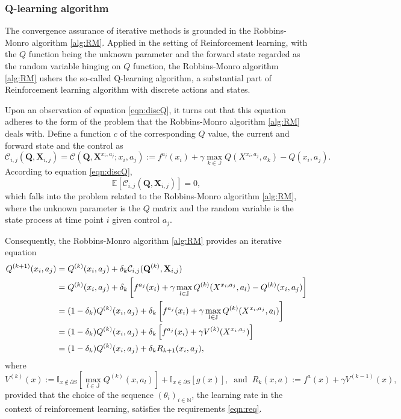 \documentclass[11pt,twoside]{article}
\numberwithin{Theorem}{section}
\numberwithin{Definition}{section}
\numberwithin{Lemma}{section}
\numberwithin{Algorithm}{section}
\numberwithin{equation}{section}
\begin{document}
\subsubsection{Q-learning algorithm}
The convergence assurance of iterative methods is grounded in the Robbins-Monro algorithm \ref{alg:RM}. Applied in the setting of Reinforcement learning, with the $Q$ function being the unknown parameter and the forward state regarded as the random variable hinging on $Q$ function, the Robbins-Monro algorithm \ref{alg:RM} ushers the so-called Q-learning algorithm, a substantial part of Reinforcement learning algorithm with discrete actions and states.

Upon an observation of equation \ref{eqn:discQ}, it turns out that this equation adheres to the form of the problem that the Robbins-Monro algorithm \ref{alg:RM} deals with. Define a function $c$ of the corresponding $Q$ value, the current and forward state and the control as
\begin{equation*}
    \mathcal{C}_{i,j}(\mathbf{Q},\mathbf{X}_{i,j})=
    \mathcal{C}(\mathbf{Q},\mathbf{X}^{x_i,a_j};x_i,a_j):=
    f^{a_j}(x_i)+\gamma\max_{k\in\mathbb{J}}Q(X^{x_i,a_j},a_k)-Q(x_i,a_j).
\end{equation*}
According to equation \ref{eqn:discQ}, 
$$
\mathbb{E}\left[\mathcal{C}_{i,j}(\mathbf{Q},\mathbf{X}_{i,j})\right]=0,
$$
which falls into the problem related to the Robbins-Monro algorithm \ref{alg:RM}, where the unknown parameter is the $Q$ matrix and the random variable is the state process at time point $i$ given control $a_j$.

Consequently, the Robbins-Monro algorithm \ref{alg:RM} provides an iterative equation
\begin{align}\label{eqn:QL}
    Q^{(k+1)}(x_i,a_j)&=Q^{(k)}(x_i,a_j)+\delta_k\mathcal{C}_{i,j}(\mathbf{Q}^{(k)},\mathbf{X}_{i,j})\notag\\
    &=Q^{(k)}(x_i,a_j)+\delta_k\left[f^{a_j}(x_i)+\gamma\max_{l\in\mathbb{J}}Q^{(k)}(X^{x_i,a_j},a_l)-Q^{(k)}(x_i,a_j)\right]  \notag\\
    &=(1-\delta_k)Q^{(k)}(x_i,a_j)+\delta_k\left[f^{a_j}(x_i)+\gamma\max_{l\in\mathbb{J}}Q^{(k)}(X^{x_i,a_j},a_l)\right]\notag\\
    &=(1-\delta_k)Q^{(k)}(x_i,a_j)+\delta_k\left[f^{a_j}(x_i)+\gamma V^{(k)}(X^{x_i,a_j})\right]\notag\\
    &=(1-\delta_k)Q^{(k)}(x_i,a_j)+\delta_k R_{k+1}(x_i,a_j),
\end{align}
where
$$
V^{(k)}(x):=\mathbb{I}_{x\notin\partial S}\left[\max_{l\in\mathbb{J}}Q^{(k)}(x,a_l)\right]
+\mathbb{I}_{x\in\partial S}\left[g(x)\right],\;\;\text{and}\;\;
R_k(x,a):=f^a(x)+\gamma V^{(k-1)}(x),
$$
provided that the choice of the sequence $(\theta_i)_{i\in\mathbb{N}}$, the learning rate in the context of reinforcement learning, satisfies the requirements \ref{eqn:req}.
\end{document}

